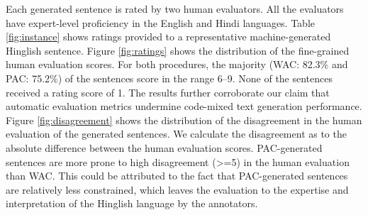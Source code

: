 \documentclass[11pt]{article}
\begin{document}
\begin{itemize}
    Each generated sentence is rated by two human evaluators. All the evaluators have expert-level proficiency in the English and Hindi languages.  Table \ref{fig:instance} shows ratings provided to a representative machine-generated Hinglish sentence.  Figure \ref{fig:ratings} shows the distribution of the fine-grained human evaluation scores. For both procedures, the majority (WAC: 82.3\% and PAC: 75.2\%) of the sentences score in the range 6--9. None of the sentences received a rating score of 1. The results further corroborate our claim that automatic evaluation metrics undermine code-mixed text generation performance. Figure \ref{fig:disagreement} shows the distribution of the disagreement in the human evaluation of the generated sentences. We calculate the disagreement as to the absolute difference between the human evaluation scores. PAC-generated sentences are more prone to high disagreement (>=5) in the human evaluation than WAC. This could be attributed to the fact that PAC-generated sentences are relatively less constrained, which leaves the evaluation to the expertise and interpretation of the Hinglish language by the annotators.  
\end{itemize}


\begin{table}[!tbh]
\centering
\small{
}
\caption{Annotator agreement on the randomly sampled sentences for WAC and PAC.}
\label{agreement}
\end{table}

\begin{table}[!tbh]
\centering
\small{
}
\caption{Automatic performance evaluation of the WAC and PAC procedures.}
\label{tab: performance}
\end{table}
\end{document}
